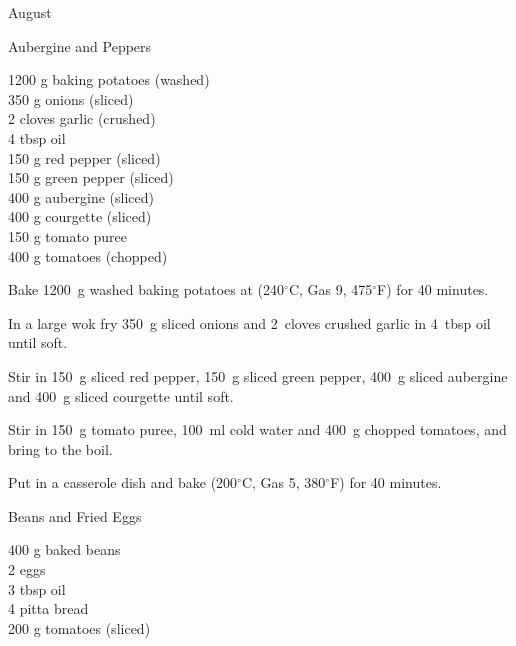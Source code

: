 \begin{menu}{August}
    \begin{recipe}{2}{Aubergine and Peppers}%
		\begin{ingredients}
		1200 g baking potatoes (washed) \\
	350 g onions (sliced) \\
	2 cloves garlic (crushed) \\
	4 tbsp oil  \\
	150 g red pepper (sliced) \\
	150 g green pepper (sliced) \\
	400 g aubergine (sliced) \\
	400 g courgette (sliced) \\
	150 g tomato puree  \\
	400 g tomatoes (chopped) \\
	
		\end{ingredients}
	
    \begin{instructions}
    \item 
      Bake 1200~g washed baking potatoes
      at
      (240$^{\circ}$C, Gas 9, 475$^{\circ}$F) for 40 minutes.
    \item 
        In a large wok fry
        350~g sliced onions
        and
        2~cloves crushed garlic
        in
        4~tbsp  oil
        until soft.
      \item 
        Stir in
        150~g sliced red pepper,
        150~g sliced green pepper,
        400~g sliced aubergine
        and
        400~g sliced courgette
        until soft.
      \item 
        Stir in
        150~g  tomato puree,
        100~ml  cold water
        and
        400~g chopped tomatoes,
        and bring to the boil.
      \item 
        Put in a casserole dish and bake (200$^{\circ}$C, Gas 5, 380$^{\circ}$F) for 40 minutes.
      
    \end{instructions}
    \end{recipe}%
  
    \begin{recipe}{1}{Beans and Fried Eggs}%
		\begin{ingredients}
		400 g baked beans  \\
	2  eggs  \\
	3 tbsp oil  \\
	4  pitta bread  \\
	200 g tomatoes (sliced) \\
	

\end{ingredients}
\end{recipe}
\end{menu}
